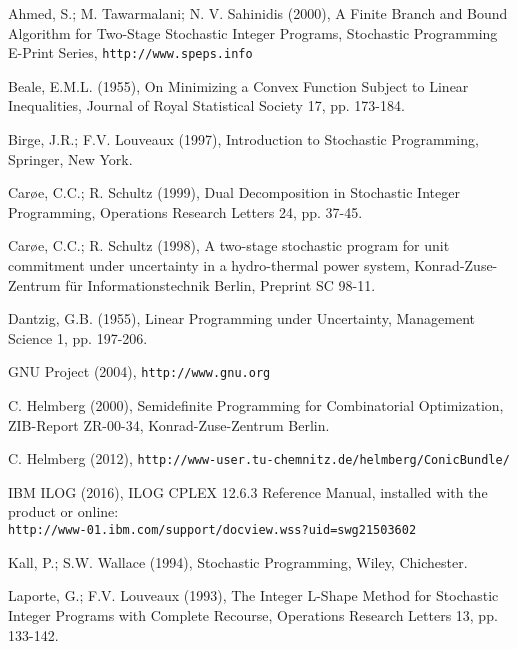 \documentclass[11pt,draft]{article}
\newcommand{\+}{{\ti{+}}}
\newcommand{\1}{{\ti{1}}}
\newcommand{\etal}{et al.\/}
\begin{document}
\begin{thebibliography}{99}

\bibitem[Ahmed \etal(2000)]{ahme} Ahmed, S.; M. Tawarmalani; N. V. Sahinidis (2000), A Finite Branch and 
Bound Algorithm for Two-Stage Stochastic Integer Programs, Stochastic Programming E-Print Series,
\texttt{http://www.speps.info} 

 Beale, E.M.L. (1955), On Minimizing a Convex Function Subject to Linear
Inequalities, Journal of Royal Statistical Society 17, pp. 173-184.

 Birge, J.R.; F.V. Louveaux (1997), Introduction to
Stochastic Programming, Springer, 
    New York.

    Car\o e, C.C.; R. Schultz (1999),         
        Dual Decomposition in Sto\-chastic Integer Programming, 
        Operations Research Letters 24, pp. 37-45.

 Car\o e, C.C.; R. Schultz (1998), A two-stage stochastic program
for unit commitment under uncertainty in a hydro-thermal power system, 
Konrad-Zuse-Zentrum f\"ur Informationstechnik Berlin, Preprint SC 98-11. 

 Dantzig, G.B. (1955), Linear Programming under Uncertainty,
Management Science 1, pp. 197-206.

 GNU Project (2004), \texttt{http://www.gnu.org}

 C. Helmberg (2000), Semidefinite Programming for Combinatorial
Optimization, ZIB-Report ZR-00-34, Konrad-Zuse-Zentrum Berlin.


 C. Helmberg (2012), {\small \texttt{http://www-user.tu-chemnitz.de/helmberg/ConicBundle/}}

	IBM ILOG (2016), ILOG CPLEX 12.6.3 Reference Manual, installed with the product or online:\\  \texttt{http://www-01.ibm.com/support/docview.wss?uid=swg21503602}

 Kall, P.; S.W. Wallace (1994), Stochastic Programming, Wiley, Chichester.

 Laporte, G.; F.V. Louveaux (1993), The Integer L-Shape Method for
Stochastic Integer Programs with Complete Recourse, Operations Research Letters 13, pp. 133-142.


\end{thebibliography}
\end{document}
